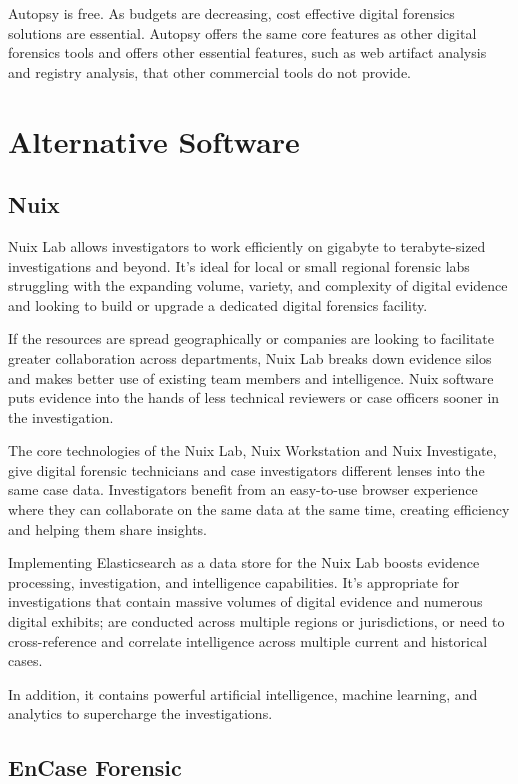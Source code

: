 Autopsy is free. As budgets are decreasing, cost effective digital forensics solutions are essential. Autopsy offers
the same core features as other digital forensics tools and offers other essential features, such as web artifact analysis
and registry analysis, that other commercial tools do not provide.

\section{Alternative Software}

\subsection{Nuix}

Nuix Lab allows investigators to work efficiently on gigabyte to terabyte-sized investigations and beyond.
It’s ideal for local or small regional forensic labs struggling with the expanding volume, variety, and 
complexity of digital evidence and looking to build or upgrade a dedicated digital forensics facility.

If the resources are spread geographically or companies are looking to facilitate greater collaboration across departments,
Nuix Lab breaks down evidence silos and makes better use of existing team members and intelligence. Nuix software puts 
evidence into the hands of less technical reviewers or case officers sooner in the investigation.

The core technologies of the Nuix Lab, Nuix Workstation and Nuix Investigate, give digital forensic technicians and case investigators 
different lenses into the same case data. Investigators benefit from an easy-to-use browser experience where they can collaborate on 
the same data at the same time, creating efficiency and helping them share insights.

Implementing Elasticsearch as a data store for the Nuix Lab boosts evidence processing, investigation, and intelligence capabilities. 
It’s appropriate for investigations that contain massive volumes of digital evidence and numerous digital exhibits; are conducted across multiple
regions or jurisdictions, or need to cross-reference and correlate intelligence across multiple current and historical cases. 

In addition, it contains powerful artificial intelligence, machine learning, and analytics to supercharge the investigations. 

\subsection{EnCase Forensic}

